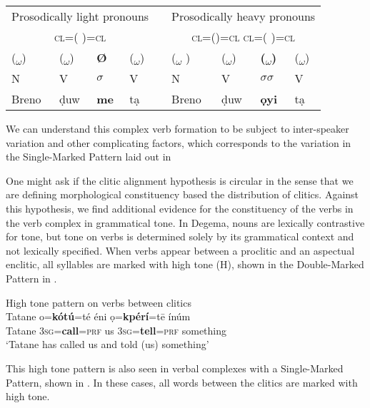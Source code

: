 \documentclass[output=paper]{langsci/langscibook}
\begin{document}
\ea
\begin{tabular}{lllllllll}
\multicolumn{4}{c}{Prosodically light pronouns}  && \multicolumn{4}{c}{Prosodically heavy pronouns}\\
  \multicolumn{4}{c}{\textsc{cl}=(        )=\textsc{cl}} && \multicolumn{4}{c}{\textsc{cl}=()=\textsc{cl}   \textsc{cl}=(  )=\textsc{cl}}\\
(\textsubscript{$\omega $}) &
(\textsubscript{$\omega $}) &
\textbf{Ø}  &
(\textsubscript{$\omega $}) & 
& 
(\textsubscript{$\omega $} ) &
(\textsubscript{$\omega $}) &
\textbf{(\textsubscript{$\omega $})} &
(\textsubscript{$\omega $})\\
 N      & V     & \textbf{$\sigma $} &  V   && N      & V    & \textbf{$\sigma \sigma $}   &   V\\
 Breno  & ḍuw   & \textbf{me}        &  tạ  && Breno  & ḍuw  & \textbf{ọyi}                &   tạ\\ 
\end{tabular}

\z

We can understand this complex verb formation to be subject to inter-speaker variation and other complicating factors, which corresponds to the variation in the Single-Marked Pattern laid out in 

One might ask if the clitic alignment hypothesis is circular in the sense that we are defining morphological constituency based the distribution of clitics. Against this hypothesis, we find additional evidence for the constituency of the verbs in the verb complex in grammatical tone. In Degema, nouns are lexically contrastive for tone, but tone on verbs is determined solely by its grammatical context and not lexically specified. When verbs appear between a proclitic and an aspectual enclitic, all syllables are marked with high tone (H), shown in the Double-Marked Pattern in .

\ea
{High tone pattern on verbs between clitics}\\
\gll  Tatane  o=\textbf{kótú}=té     éni   ọ=\textbf{kpérí}=tē     ínúm\\
     Tatane  3\textsc{sg}=\textbf{call}=\textsc{prf}   us   3\textsc{sg}=\textbf{tell}=\textsc{prf}  something\\
\glt ‘Tatane has called us and told (us) something’ \citep[285]{Kari2003a} 
\z

This high tone pattern is also seen in verbal complexes with a Single-Marked Pattern, shown in . In these cases, all words between the clitics are marked with high tone. 
\end{document}
